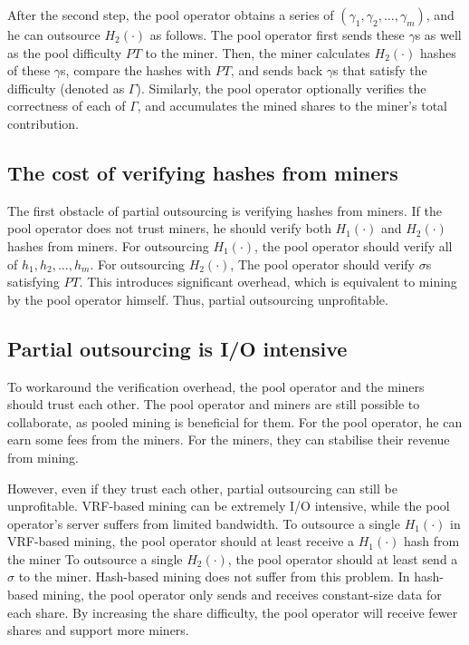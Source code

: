 After the second step, the pool operator obtains a series of $(\gamma_1, \gamma_2, \dots, \gamma_m)$, and he can outsource $H_2(\cdot)$ as follows.
The pool operator first sends these $\gamma$s as well as the pool difficulty $PT$ to the miner.
Then, the miner calculates $H_2(\cdot)$ hashes of these $\gamma$s, compare the hashes with $PT$, and sends back $\gamma$s that satisfy the difficulty (denoted as $\Gamma$).
Similarly, the pool operator optionally verifies the correctness of each of $\Gamma$, and accumulates the mined shares to the miner's total contribution.


\subsection{The cost of verifying hashes from miners}

The first obstacle of partial outsourcing is verifying hashes from miners.
If the pool operator does not trust miners, he should verify both $H_1(\cdot)$ and $H_2(\cdot)$ hashes from miners.
For outsourcing $H_1(\cdot)$, the pool operator should verify all of $h_1, h_2, \dots, h_m$.
For outsourcing $H_2(\cdot)$, The pool operator should verify $\sigma$s satisfying $PT$.
This introduces significant overhead, which is equivalent to mining by the pool operator himself.
Thus, partial outsourcing unprofitable.


\subsection{Partial outsourcing is I/O intensive}

To workaround the verification overhead, the pool operator and the miners should trust each other.
The pool operator and miners are still possible to collaborate, as pooled mining is beneficial for them.
For the pool operator, he can earn some fees from the miners.
For the miners, they can stabilise their revenue from mining.

However, even if they trust each other, partial outsourcing can still be unprofitable.
VRF-based mining can be extremely I/O intensive, while the pool operator's server suffers from limited bandwidth.
To outsource a single $H_1(\cdot)$ in VRF-based mining, the pool operator should at least receive a $H_1(\cdot)$ hash from the miner
To outsource a single $H_2(\cdot)$, the pool operator should at least send a $\sigma$ to the miner.
Hash-based mining does not suffer from this problem.
In hash-based mining, the pool operator only sends and receives constant-size data for each share.
By increasing the share difficulty, the pool operator will receive fewer shares and support more miners.

